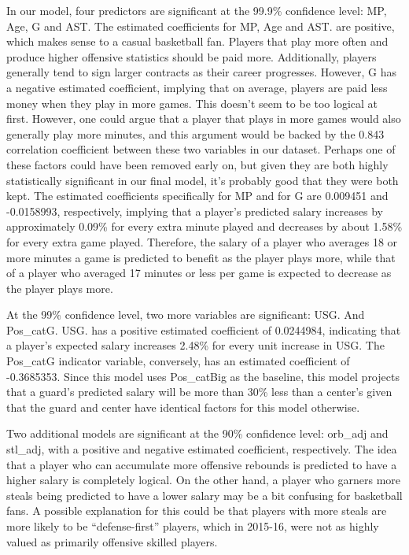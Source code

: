 \documentclass[]{article}
\begin{document}
In our model, four predictors are significant at the 99.9\% confidence
level: MP, Age, G and AST. The estimated coefficients for MP, Age and
AST. are positive, which makes sense to a casual basketball fan. Players
that play more often and produce higher offensive statistics should be
paid more. Additionally, players generally tend to sign larger contracts
as their career progresses. However, G has a negative estimated
coefficient, implying that on average, players are paid less money when
they play in more games. This doesn't seem to be too logical at first.
However, one could argue that a player that plays in more games would
also generally play more minutes, and this argument would be backed by
the 0.843 correlation coefficient between these two variables in our
dataset. Perhaps one of these factors could have been removed early on,
but given they are both highly statistically significant in our final
model, it's probably good that they were both kept. The estimated
coefficients specifically for MP and for G are 0.009451 and -0.0158993,
respectively, implying that a player's predicted salary increases by
approximately 0.09\% for every extra minute played and decreases by
about 1.58\% for every extra game played. Therefore, the salary of a
player who averages 18 or more minutes a game is predicted to benefit as
the player plays more, while that of a player who averaged 17 minutes or
less per game is expected to decrease as the player plays more.

At the 99\% confidence level, two more variables are significant: USG.
And Pos\_catG. USG. has a positive estimated coefficient of 0.0244984,
indicating that a player's expected salary increases 2.48\% for every
unit increase in USG. The Pos\_catG indicator variable, conversely, has
an estimated coefficient of -0.3685353. Since this model uses
Pos\_catBig as the baseline, this model projects that a guard's
predicted salary will be more than 30\% less than a center's given that
the guard and center have identical factors for this model otherwise.

Two additional models are significant at the 90\% confidence level:
orb\_adj and stl\_adj, with a positive and negative estimated
coefficient, respectively. The idea that a player who can accumulate
more offensive rebounds is predicted to have a higher salary is
completely logical. On the other hand, a player who garners more steals
being predicted to have a lower salary may be a bit confusing for
basketball fans. A possible explanation for this could be that players
with more steals are more likely to be ``defense-first'' players, which
in 2015-16, were not as highly valued as primarily offensive skilled
players.
\end{document}

